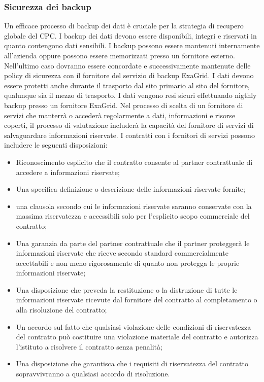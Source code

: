 \documentclass[12pt, a4paper, titlepage]{report}
\newcommand{\backupVendor}{ExaGrid} %
\begin{document}
		\subsubsection{Sicurezza dei backup}
		Un efficace processo di backup dei dati è cruciale per la strategia di recupero globale del CPC. I backup dei dati devono essere disponibili, integri e riservati in quanto contengono dati sensibili.
		I backup possono essere mantenuti internamente all'azienda oppure possono essere memorizzati presso un fornitore esterno. Nell'ultimo caso dovranno essere concordate e successivamente mantenute delle policy di sicurezza con il fornitore del servizio di backup \backupVendor. I dati devono essere protetti anche durante il trasporto dal sito primario al sito del fornitore, qualunque sia il mezzo di trasporto.
		I dati vengono resi sicuri effettuando nigthly backup presso un fornitore \backupVendor.
		Nel processo di scelta di un fornitore di servizi che manterrà o accederà regolarmente a dati, informazioni e risorse coperti, il processo di valutazione includerà la capacità del fornitore di servizi di	salvaguardare informazioni riservate. 
		I contratti con i fornitori di servizi possono includere le seguenti disposizioni:
		\begin{itemize}
			\item Riconoscimento esplicito che il contratto consente al partner contrattuale di accedere a informazioni riservate;
			\item Una specifica definizione o descrizione delle informazioni riservate fornite; \item una clausola secondo cui le informazioni riservate saranno conservate con la massima riservatezza e accessibili solo per l'esplicito scopo commerciale del contratto; 
			\item Una garanzia da parte del partner contrattuale che il partner proteggerà le informazioni riservate che riceve secondo standard commercialmente accettabili e non meno rigorosamente di quanto non protegga le proprie informazioni riservate; 
			\item Una disposizione che preveda la restituzione o la distruzione di tutte le informazioni riservate ricevute dal fornitore del contratto al completamento o alla risoluzione del contratto; 
			\item Un accordo sul fatto che qualsiasi violazione delle condizioni di riservatezza del contratto può costituire una violazione materiale del contratto e autorizza l'istituto a risolvere il contratto senza penalità;
			\item Una disposizione che garantisca che i requisiti di riservatezza del contratto sopravvivranno a qualsiasi accordo di risoluzione.
		\end{itemize}
		
\end{document}
